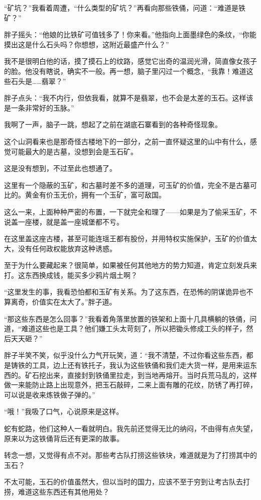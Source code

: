 “矿坑？”我看着周遭，“什么类型的矿坑？”再看向那些铁俑，问道：“难道是铁矿？”

胖子摇头：“他娘的比铁矿可值钱多了！你来看。”他指向上面墨绿色的条纹，“你能摸出这是什么石头吗？你想想，这附近最盛产什么？”

我不是很明白他的话，摸了摸石上的纹路，感觉它出奇的温润光滑，简直像女孩子的脸。他没有瞎说，确实不一般。再一想，脑子里闪过一个概念，“我靠！难道这些石头是……翡翠？”

胖子点头：“我不内行，但依我看，就算不是翡翠，也不会是太差的玉石。这样该是一条非常好的玉脉。”

我啊了一声，脑子一跳，想起了之前在湖底石寨看到的各种奇怪现象。

这个山洞看来也是那奇怪古楼地下的一部分，之前一直怀疑这里的山中有什么，感觉可能最大的是古墓，没想到会是玉石矿。

这是没有想到，不过至此也想通了。

这里有一个隐蔽的玉矿，和古墓时差不多的道理，可玉矿的价值，完全不是古墓可比的。黄金有价玉无价，拥有一个玉矿，富可敌国。

这么一来，上面种种严密的布置，一下就完全和理了——如果是为了偷采玉矿，不说盖一座楼，就是盖一座城堡都不亏。

在这里盖这座古楼，甚至可能连瑶王都有股份，并用特权实施保护，玉矿的价值太大，没有任何政权能放弃这种诱惑。

至于为什么要藏起来？很简单，如果被任何其他地方的势力知道，肯定立刻发兵来打。这东西换成钱，能买多少鸦片烟土啊？

“这里发生的事，我看恐怕都和玉矿有关系。为了这东西，在恐怖的阴谋诡异也不算离奇，价值实在太大了。”胖子道。

“那这些东西是怎么回事？”我看着角落里放置的铁架和上面十几具横躺的铁俑，问道，“难道这些也是工具？他们嫌工头太苛刻了，所以把锄头修成工头的样子，然后天天砸？”

胖子半笑不笑，似乎没什么力气开玩笑，道：“我不清楚，不过你看这些东西，都是铸铁的工具，边上还有铁托子，我认为这些铁俑和我们走大货一样，是用来运东西的。矿石挖出来，直接封到铁俑里拉走，到当地再熔开。当时兵荒马乱的，这样做一来能防止路上出现意外，把玉石敲碎，二来上面有雕的花纹，防锈了再打碎，可以说是收来炼铁做子弹的。”

“哦！”我吸了口气，心说原来是这样。

蛇有蛇路，他们这种人一看就明白。我先前还觉得无比的纳闷，不由得有点失望，原来以为这铁俑背后还有更深的故事。

转念一想，又觉得有点不对。那些考古队打捞这些铁块，难道就是为了打捞其中的玉石？

不太可能，玉石的价值虽然大，但以当时的国力，应该不至于穷到让考古队去打捞，难道这些东西还有其他用处？

